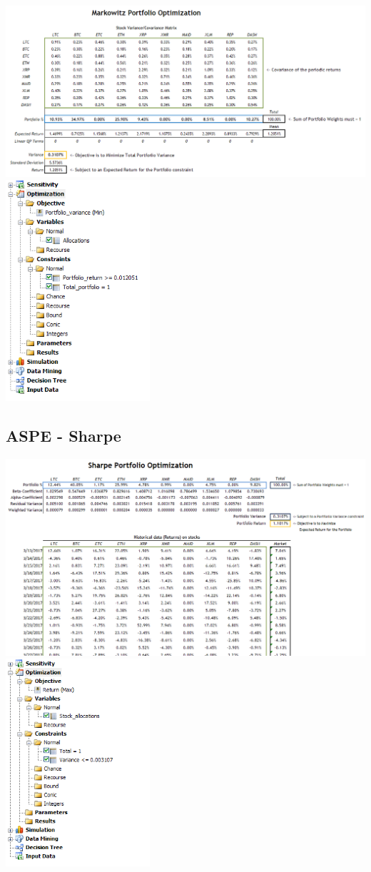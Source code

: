 \documentclass[12pt]{article} %
\begin{document}
\includegraphics[width=\textwidth]{aspe1}
\includegraphics[width=0.4\textwidth]{aspe2}

\subsection*{ASPE - Sharpe}
\includegraphics[width=\textwidth]{aspe3}
\includegraphics[width=0.4\textwidth]{aspe4}
\end{document}
